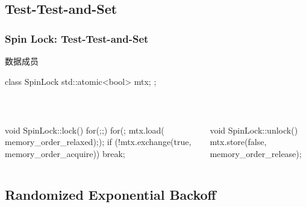 \documentclass[UTF8,lualatex]{ctexbeamer}
\begin{document}
\subsection{Test-Test-and-Set}

\begin{frame}[fragile]
    \frametitle{Spin Lock: Test-Test-and-Set}
    \scriptsize
    \begin{block}{数据成员}
        \begin{cppcode}
            class SpinLock {
                std::atomic<bool> mtx;
            };
        \end{cppcode}
    \end{block}
    \begin{columns}[t]
        \begin{column}{.5\textwidth}
            \begin{block}{~}
                \begin{cppcode}
                    void SpinLock::lock() {
                        for(;;) {
                            for(; mtx.load(
                                memory_order_relaxed););
                            if (!mtx.exchange(true,
                                memory_order_acquire))
                            {
                                break;
                            }
                        }
                    }
                \end{cppcode}
            \end{block}
        \end{column}
        \begin{column}{.5\textwidth}
            \begin{block}{~}
                \begin{cppcode}
                    void SpinLock::unlock() {
                        mtx.store(false,
                            memory_order_release);
                    }
                \end{cppcode}
            \end{block}
        \end{column}
    \end{columns}
\end{frame}


\subsection{Randomized Exponential Backoff}
\end{document}
